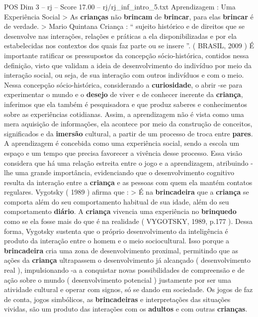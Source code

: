 \begin{textsample}{POS Dim 3 – rj – Score 17.00 – rj/rj\_inf\_intro\_5.txt}  \label{ex:f3_pos_019}
Aprendizagem : Uma Experiência Social > As \textbf{crianças} não \textbf{brincam} de \textbf{brincar}, para elas \textbf{brincar} é de verdade. > Mario Quintana Criança : “ sujeito histórico e de direitos que se desenvolve nas interações, relações e práticas a ela disponibilizadas e por ela estabelecidas nos contextos dos quais faz parte ou se insere ”. ( BRASIL, 2009 ) É importante ratificar os pressupostos da concepção sócio-histórica, contidos nessa definição, visto que validam a ideia de desenvolvimento do indivíduo por meio da interação social, ou seja, de sua interação com outros indivíduos e com o meio.
Nessa concepção sócio-histórica, considerando a \textbf{curiosidade}, o abrir -se para experimentar o mundo e o \textbf{desejo} de viver e de conhecer inerente da \textbf{criança}, inferimos que ela também é pesquisadora e que produz saberes e conhecimentos sobre as experiências cotidianas.
Assim, a aprendizagem não é vista como uma mera aquisição de informações, ela acontece por meio da construção de conceitos, significados e da \textbf{imersão} cultural, a partir de um processo de troca entre \textbf{pares}.
A aprendizagem é concebida como uma experiência social, sendo a escola um espaço e um tempo que precisa favorecer a vivência desse processo.
Essa visão considera que há uma relação estreita entre o jogo e a aprendizagem, atribuindo -lhe uma grande importância, evidenciando que o desenvolvimento cognitivo resulta da interação entre a \textbf{criança} e as pessoas com quem ela mantém contatos regulares.
Vygotsky ( 1989 ) afirma que : > É na \textbf{brincadeira} que a \textbf{criança} se comporta além do seu comportamento habitual de sua idade, além do seu comportamento \textbf{diário}.
A \textbf{criança} vivencia uma experiência no \textbf{brinquedo} como se ela fosse mais do que é na realidade ( VYGOTSKY, 1989, p.177 ).
Dessa forma, Vygotsky sustenta que o próprio desenvolvimento da inteligência é produto da interação entre o homem e o meio sociocultural.
Isso porque a \textbf{brincadeira} cria uma zona de desenvolvimento proximal, permitindo que as ações da \textbf{criança} ultrapassem o desenvolvimento já alcançado ( desenvolvimento real ), impulsionando -a a conquistar novas possibilidades de compreensão e de ação sobre o mundo ( desenvolvimento potencial ) justamente por ser uma atividade cultural e operar com signos, só se dando em sociedade.
Os jogos de faz de conta, jogos simbólicos, as \textbf{brincadeiras} e interpretações das situações vividas, são um produto das interações com os \textbf{adultos} e com outras \textbf{crianças}.

\end{textsample}
